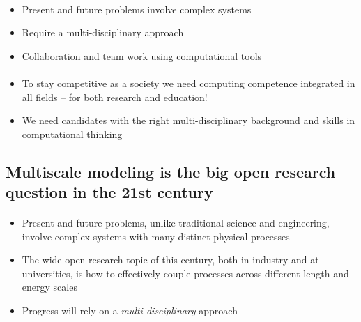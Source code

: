 \documentclass[%
twoside,                 %
final,                   %
10pt]{article}
\begin{document}
\noindent




\paragraph{}
\begin{itemize}
\item Present and future problems involve complex systems

\item Require a multi-disciplinary approach

\item Collaboration and team work using computational tools
\end{itemize}

\noindent




\paragraph{}
\begin{itemize}
\item To stay competitive as a society we need computing competence integrated in all fields – for both research and education!

\item We need candidates with the right multi-disciplinary background and skills in computational thinking
\end{itemize}

\noindent




\subsection{Multiscale modeling is the big open research question in the 21st century}


\paragraph{}
\begin{itemize}
\item Present and future problems, unlike traditional science and engineering, involve complex systems with many distinct physical processes

\item The wide open research topic of this century, both in industry and at universities, is how to effectively couple processes across different length and energy scales

\item Progress will rely on a \emph{multi-disciplinary} approach
\end{itemize}
\end{document}
